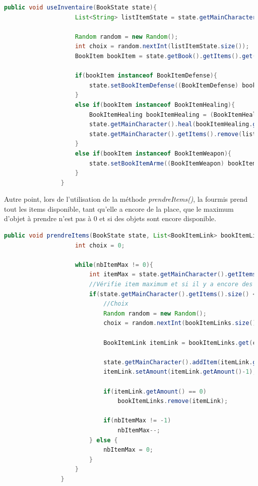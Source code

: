 			\begin{lstlisting}[gobble=16, language=java, caption=useInventaire() de Fourmis]
				public void useInventaire(BookState state){
					List<String> listItemState = state.getMainCharacter().getItems();

					Random random = new Random();
					int choix = random.nextInt(listItemState.size());
					BookItem bookItem = state.getBook().getItems().get(listItemState.get(choix));

					if(bookItem instanceof BookItemDefense){
						state.setBookItemDefense((BookItemDefense) bookItem);
					}
					else if(bookItem instanceof BookItemHealing){
						BookItemHealing bookItemHealing = (BookItemHealing) bookItem;
						state.getMainCharacter().heal(bookItemHealing.getHp());
						state.getMainCharacter().getItems().remove(listItemState.get(choix));
					}
					else if(bookItem instanceof BookItemWeapon){
						state.setBookItemArme((BookItemWeapon) bookItem);
					}
				}
			\end{lstlisting}

			Autre point, lors de l'utilisation de la méthode \textit{prendreItems()}, la fourmis prend tout les items disponible, tant qu'elle a encore de la place, que le maximum d'objet à prendre n'est pas à 0 et si des objets sont encore disponible.

			\begin{lstlisting}[gobble=16, language=java, caption=prendreItems() de Fourmis]
				public void prendreItems(BookState state, List<BookItemLink> bookItemLinks, int nbItemMax){
					int choix = 0;

					while(nbItemMax != 0){
						int itemMax = state.getMainCharacter().getItemsMax();
						//Vérifie item maximum et si il y a encore des items à prendre
						if(state.getMainCharacter().getItems().size() < itemMax && !bookItemLinks.isEmpty()){
							//Choix
							Random random = new Random();
							choix = random.nextInt(bookItemLinks.size());

							BookItemLink itemLink = bookItemLinks.get(choix);

							state.getMainCharacter().addItem(itemLink.getId());
							itemLink.setAmount(itemLink.getAmount()-1);

							if(itemLink.getAmount() == 0)
								bookItemLinks.remove(itemLink);

							if(nbItemMax != -1)
								nbItemMax--;
						} else {
							nbItemMax = 0;
						}
					}
				}
			\end{lstlisting}

